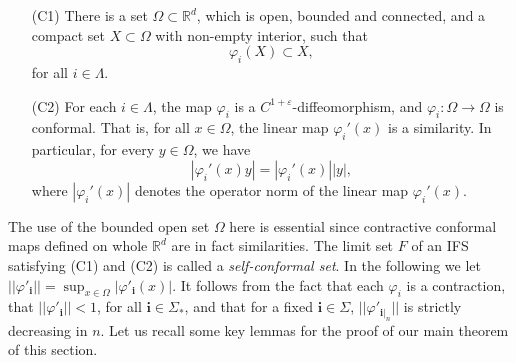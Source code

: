 \documentclass{PRM}
\newcommand{\field}[1]{\mathbb{#1}}
\newcommand{\R}{\field{R}}
\theoremstyle{plain}
\theoremstyle{definition}
\theoremstyle{remark}
\begin{document}
\begin{enumerate}
    \item[(C1)] There is a set $\Omega\subset \R^d$, which is open, bounded and connected, and a compact set $X\subset\Omega$ with non-empty interior, such that
    \begin{equation*}
        \varphi_{i}(X)\subset X,
    \end{equation*}
    for all $i\in\Lambda$.
    \item[(C2)] For each $i\in\Lambda$, the map $\varphi_i$ is a $C^{1+\varepsilon}$-diffeomorphism, and $\varphi_i\colon \Omega\to\Omega$ is conformal. That is, for all $x\in\Omega$, the linear map $\varphi_i'(x)$ is a similarity. In particular, for every $y\in \Omega$, we have
    \begin{equation*}
        |\varphi_i'(x)y|= |\varphi_i'(x)||y|,
    \end{equation*}
    where $|\varphi_i'(x)|$ denotes the operator norm of the linear map $\varphi_i'(x)$.
\end{enumerate}
The use of the bounded open set $\Omega$ here is essential since contractive conformal maps defined on whole $\R^d$ are in fact similarities. The limit set $F$ of an IFS satisfying (C1) and (C2) is called a \emph{self-conformal set}. In the following we let $||\varphi'_{\mathbf{i}}||=\sup_{x\in \Omega}|\varphi'_{\mathbf{i}}(x)|$. It follows from the fact that each $\varphi_i$ is a contraction, that $||\varphi'_{\mathbf{i}}||<1$, for all $\mathbf{i}\in\Sigma_*$, and that for a fixed $\mathbf{i}\in\Sigma$, $||\varphi'_{\mathbf{i}|_n}||$ is strictly decreasing in $n$. Let us recall some key lemmas for the proof of our main theorem of this section.
\end{document}
